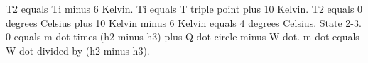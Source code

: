T2 equals Ti minus 6 Kelvin.
Ti equals T triple point plus 10 Kelvin.
T2 equals 0 degrees Celsius plus 10 Kelvin minus 6 Kelvin equals 4 degrees Celsius.
State 2-3.
0 equals m dot times (h2 minus h3) plus Q dot circle minus W dot.
m dot equals W dot divided by (h2 minus h3).